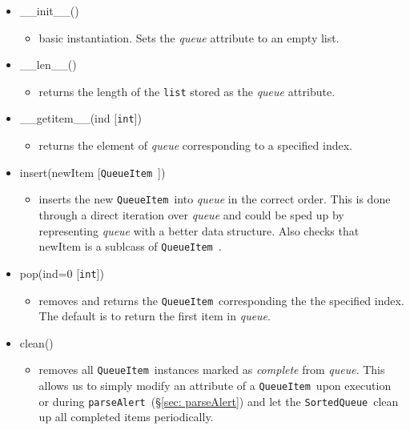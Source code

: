 \documentclass{article}
\newcommand{\parseAlert}{\texttt{parseAlert}~}
\newcommand{\SortedQueue}{\texttt{SortedQueue}~}
\newcommand{\QueueItem}{\texttt{QueueItem}~}
\begin{document}
\begin{itemize}
    \item{\_\_init\_\_()
        \begin{itemize}
            \item{basic instantiation. Sets the \textit{queue} attribute to an empty list.}
        \end{itemize}
         }
    \item{\_\_len\_\_()
        \begin{itemize}
            \item{returns the length of the \texttt{list} stored as the \textit{queue} attribute.}
        \end{itemize}
         }
    \item{\_\_getitem\_\_(ind [\texttt{int}])
        \begin{itemize}
            \item{returns the element of \textit{queue} corresponding to a specified index.}
        \end{itemize}
         }
    \item{insert(newItem [\QueueItem])
        \begin{itemize}
            \item{inserts the new \QueueItem into \textit{queue} in the correct order. This is done through a direct iteration over \textit{queue} and could be sped up by representing \textit{queue} with a better data structure. Also checks that newItem is a sublcass of \QueueItem.}
        \end{itemize}
         }
    \item{pop(ind=0 [\texttt{int}])
        \begin{itemize}
            \item{removes and returns the \QueueItem corresponding the the specified index. The default is to return the first item in \textit{queue}.}
        \end{itemize}
         }
    \item{clean()
        \begin{itemize}
            \item{removes all \QueueItem instances marked as \textit{complete} from \textit{queue}. This allows us to simply modify an attribute of a \QueueItem upon execution or during \parseAlert (\S\ref{sec: parseAlert}) and let the \SortedQueue clean up all completed items periodically.}
        \end{itemize}
         }
\end{itemize}
\end{document}
